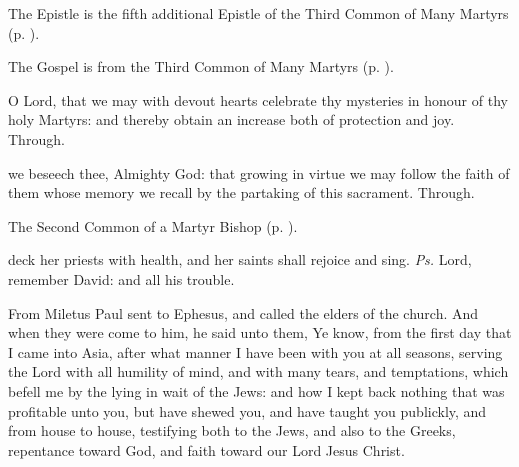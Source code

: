 \begin{rubric}
	The Epistle is the fifth additional Epistle of the Third Common of Many Martyrs (p. \pageref{Hebrews1133}).
\end{rubric}


\begin{rubric}
	The Gospel is from the Third Common of Many Martyrs (p. \pageref{CommonMartyrsIIIGospel}).
\end{rubric}


\secret\label{HolyMaccabeesSecret}
 O Lord, that we may with devout hearts celebrate thy mysteries in honour of thy holy Martyrs: and thereby obtain an increase both of protection and joy. Through.


\postcommunion\label{HolyMaccabeesPostcommunion}
 we beseech thee, Almighty God: that growing in virtue we may follow the faith of them whose memory we recall by the partaking of this sacrament. Through.



\begin{rubric}
	The Second Common of a Martyr Bishop (p. \pageref{CommonMartyrBishopII}).
\end{rubric}

\introit
{} deck her priests with health, and her saints shall rejoice and sing. \textit{Ps.} Lord, remember David: and all his trouble.


 From Miletus Paul sent to Ephesus, and called the elders of the church. And when they were come to him, he said unto them, Ye know, from the first day that I came into Asia, after what manner I have been with you at all seasons, serving the Lord with all humility of mind, and with many tears, and temptations, which befell me by the lying in wait of the Jews: and how I kept back nothing that was profitable unto you, but have shewed you, and have taught you publickly, and from house to house, testifying both to the Jews, and also to the Greeks, repentance toward God, and faith toward our Lord Jesus Christ.

